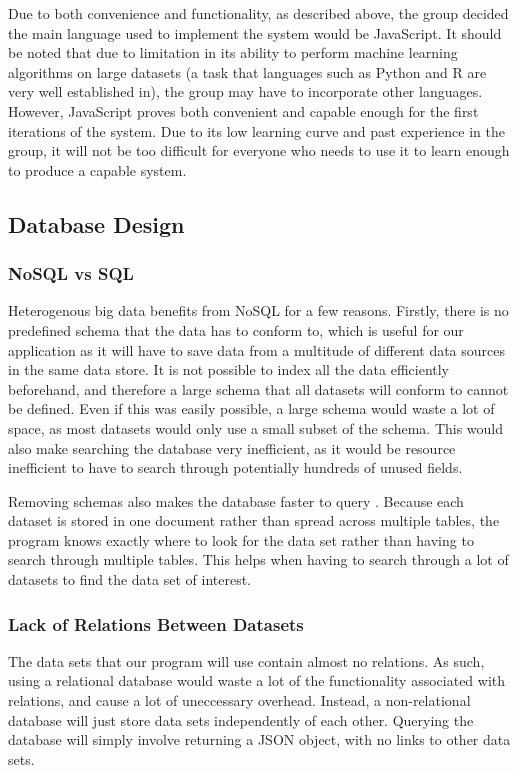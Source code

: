 \documentclass[titlepage]{article}
\begin{document}
Due to both convenience and functionality, as described above, the group decided the main language used to implement the system would be JavaScript. It should be noted that due to limitation in its ability to perform machine learning algorithms on large datasets (a task that languages such as Python and R are very well established in), the group may have to incorporate other languages. However, JavaScript proves both convenient and capable enough for the first iterations of the system. Due to its low learning curve and past experience in the group, it will not be too difficult for everyone who needs to use it to learn enough to produce a capable system.

\subsection{Database Design\label{dbdesign}}
\subsubsection{NoSQL vs SQL}
Heterogenous big data benefits from NoSQL for a few reasons. Firstly, there is no predefined schema that the data has to conform to, which is useful for our application as it will have to save data from a multitude of different data sources in the same data store. It is not possible to index all the data efficiently beforehand, and therefore a large schema that all datasets will conform to cannot be defined. Even if this was easily possible, a large schema would waste a lot of space, as most datasets would only use a small subset of the schema. This would also make searching the database very inefficient, as it would be resource inefficient to have to search through potentially hundreds of unused fields.

Removing schemas also makes the database faster to query \cite{sqlvsnosql}. Because each dataset is stored in one document rather than spread across multiple tables, the program knows exactly where to look for the data set rather than having to search through multiple tables. This helps when having to search through a lot of datasets to find the data set of interest.

\subsubsection{Lack of Relations Between Datasets}
The data sets that our program will use contain almost no relations. As such, using a relational database would waste a lot of the functionality associated with relations, and cause a lot of uneccessary overhead. Instead, a non-relational database will just store data sets independently of each other. Querying the database will simply involve returning a JSON object, with no links to other data sets.
\end{document}
